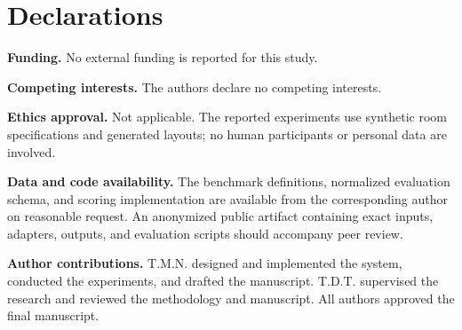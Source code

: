 \documentclass[pdflatex,sn-mathphys-num]{sn-jnl}
\begin{document}
\backmatter

\section*{Declarations}

\textbf{Funding.} No external funding is reported for this study.

\textbf{Competing interests.} The authors declare no competing interests.

\textbf{Ethics approval.} Not applicable. The reported experiments use synthetic room specifications and generated layouts; no human participants or personal data are involved.

\textbf{Data and code availability.} The benchmark definitions, normalized evaluation schema, and scoring implementation are available from the corresponding author on reasonable request. An anonymized public artifact containing exact inputs, adapters, outputs, and evaluation scripts should accompany peer review.

\textbf{Author contributions.} T.M.N. designed and implemented the system, conducted the experiments, and drafted the manuscript. T.D.T. supervised the research and reviewed the methodology and manuscript. All authors approved the final manuscript.
\end{document}
